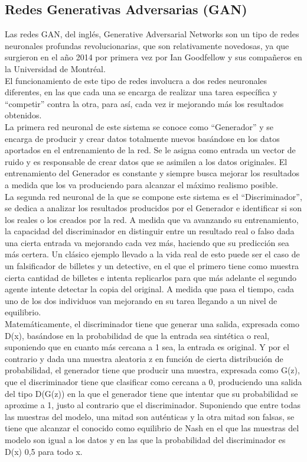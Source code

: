 \subsection{Redes Generativas Adversarias (GAN)}

Las redes GAN, del inglés, Generative Adversarial Networks son un tipo de redes neuronales profundas revolucionarias, que son relativamente novedosas, ya que surgieron en el año 2014 por primera vez por Ian Goodfellow y sus compañeros en la Universidad de Montréal. \\

El funcionamiento de este tipo de redes involucra a dos redes neuronales diferentes, en las que cada una se encarga de realizar una tarea específica y “competir” contra la otra, para así, cada vez ir mejorando más los resultados obtenidos. \\

La primera red neuronal de este sistema se conoce como “Generador” y se encarga de producir y crear datos totalmente nuevos basándose en los datos aportados en el entrenamiento de la red. Se le asigna como entrada un vector de ruido y es responsable de crear datos que se asimilen a los datos originales. El entrenamiento del Generador es constante y siempre busca mejorar los resultados a medida que los va produciendo para alcanzar el máximo realismo posible. \\

La segunda red neuronal de la que se compone este sistema es el “Discriminador”, se dedica a analizar los resultados producidos por el Generador e identificar si son los reales o los creados por la red. A medida que va avanzando su entrenamiento, la capacidad del discriminador en distinguir entre un resultado real o falso dada una cierta entrada va mejorando cada vez más, haciendo que su predicción sea más certera. 
Un clásico ejemplo llevado a la vida real de esto puede ser el caso de un falsificador de billetes y un detective, en el que el primero tiene como muestra cierta cantidad de billetes e intenta replicarlos para que más adelante el segundo agente intente detectar la copia del original. A medida que pasa el tiempo, cada uno de los dos individuos van mejorando en su tarea llegando a un nivel de equilibrio. \\

Matemáticamente, el discriminador tiene que generar una salida, expresada como D(x), basándose en la probabilidad de que la entrada sea sintética o real, suponiendo que en cuanto más cercana a 1 sea, la entrada es original. Y por el contrario y dada una muestra aleatoria z en función de cierta distribución de probabilidad, el generador tiene que producir una muestra, expresada como G(z), que el discriminador tiene que clasificar como cercana a 0, produciendo una salida del tipo D(G(z)) en la que el generador tiene que intentar que su probabilidad se aproxime a 1, justo al contrario que el discriminador. Suponiendo que entre todas las muestras del modelo, una mitad son auténticas y la otra mitad son falsas, se tiene que alcanzar el conocido como equilibrio de Nash en el que las muestras del modelo son igual a los datos y en las que la probabilidad del discriminador es D(x) 0,5 para todo x. \\

